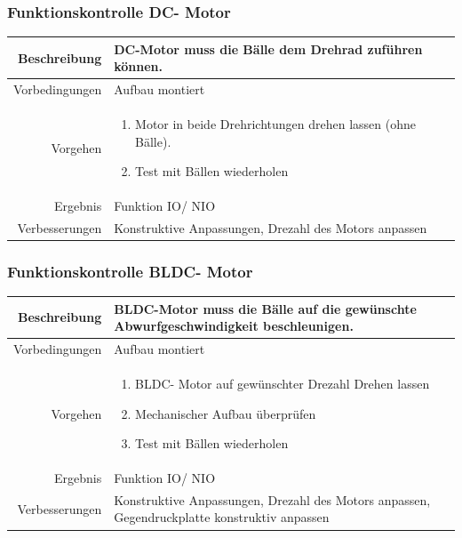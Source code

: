 \subsubsection{Funktionskontrolle DC- Motor}
\begin{table}[h!]
	\renewcommand{\arraystretch}{1.5}
	\begin{tabular}{|r|p{14cm}|}
		\hline Beschreibung & DC-Motor muss die Bälle dem Drehrad zuführen können.  \\ 
		\hline Vorbedingungen & Aufbau montiert \\ 
		\hline Vorgehen & 
		\begin{enumerate}
			\item Motor in beide Drehrichtungen drehen lassen (ohne Bälle). 
			\item Test mit Bällen wiederholen
		\end{enumerate} \\ 
		\hline Ergebnis & Funktion IO/ NIO \\ 
		\hline Verbesserungen & Konstruktive Anpassungen, Drezahl des Motors anpassen \\ 
		\hline 
	\end{tabular}
\end{table}

\subsubsection{Funktionskontrolle BLDC- Motor}
\begin{table}[h!]
	\renewcommand{\arraystretch}{1.5}
	\begin{tabular}{|r|p{14cm}|}
		\hline Beschreibung & BLDC-Motor muss die Bälle auf die gewünschte Abwurfgeschwindigkeit beschleunigen.  \\ 
		\hline Vorbedingungen & Aufbau montiert \\ 
		\hline Vorgehen & 
		\begin{enumerate}
			\item BLDC- Motor auf gewünschter Drezahl Drehen lassen 
			\item Mechanischer Aufbau überprüfen
			\item Test mit Bällen wiederholen 
		\end{enumerate} \\ 
		\hline Ergebnis & Funktion IO/ NIO \\ 
		\hline Verbesserungen & Konstruktive Anpassungen, Drezahl des Motors anpassen, Gegendruckplatte konstruktiv anpassen \\ 
		\hline 
	\end{tabular}
\end{table}

